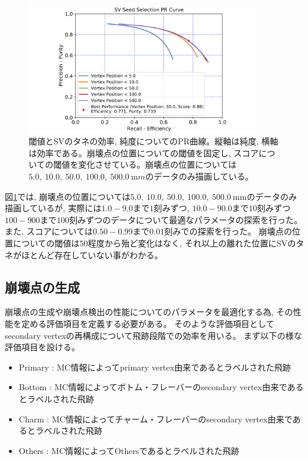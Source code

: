 \begin{figure}[htbp]
 \centering
 \includegraphics[width=0.9\textwidth, clip]{Figure/4VertexFinderwithDL/4-2-1-2PRCurve.png}
 \caption[閾値とSVのタネの効率, 純度についてのPR曲線]{閾値とSVのタネの効率, 純度についてのPR曲線。縦軸は純度, 横軸は効率である。崩壊点の位置についての閾値を固定し, スコアについての閾値を変化させている。崩壊点の位置については$5.0,\ 10.0,\ 50.0,\ 100.0,\ 500.0\ {\mathrm mm}$のデータのみ描画している。}
 \label{4-2-1-2PRCurve}
\end{figure}

図\ref{4-2-1-2PRCurve}では, 崩壊点の位置については$5.0,\ 10.0,\ 50.0,\ 100.0,\ 500.0\ {\mathrm{mm}}$のデータのみ描画しているが, 実際には$1.0-9.0$まで$1$刻みずつ, $10.0-90.0$まで$10$刻みずつ$100-900$まで$100$刻みずつのデータについて最適なパラメータの探索を行った。
また, スコアについては$0.50-0.99$まで$0.01$刻みでの探索を行った。
崩壊点の位置についての閾値は$50$程度から殆ど変化はなく, それ以上の離れた位置にSVのタネがほとんど存在していない事がわかる。

\subsection{崩壊点の生成} \label{VFDL:TPVFDL:VertexProduction}

崩壊点の生成や崩壊点検出の性能についてのパラメータを最適化する為, その性能を定める評価項目を定義する必要がある。
そのような評価項目としてsecondary vertexの再構成について飛跡段階での効率を用いる。
まず以下の様な評価項目を設ける。

\begin{itemize}
 \item Primary : MC情報によってprimary vertex由来であるとラベルされた飛跡
 \item Bottom : MC情報によってボトム・フレーバーのsecondary vertex由来であるとラベルされた飛跡
 \item Charm : MC情報によってチャーム・フレーバーのsecondary vertex由来であるとラベルされた飛跡
  \item Others : MC情報によってOthersであるとラベルされた飛跡
\end{itemize}

